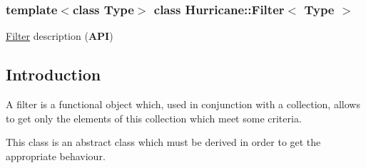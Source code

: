 \subsubsection*{template$<$class Type$>$\newline
class Hurricane\+::\+Filter$<$ Type $>$}

\mbox{\hyperlink{classHurricane_1_1Filter}{Filter}} description ({\bfseries A\+PI}) 

\hypertarget{classHurricane_1_1Filter_secFilterIntro}{}\subsection{Introduction}\label{classHurricane_1_1Filter_secFilterIntro}
A filter is a functional object which, used in conjunction with a collection, allows to get only the elements of this collection which meet some criteria.

This class is an abstract class which must be derived in order to get the appropriate behaviour.

